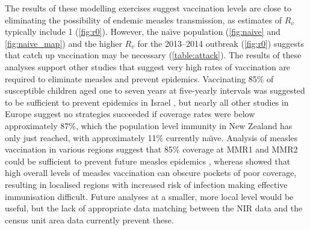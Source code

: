 \documentclass{article}
\begin{document}
The results of these modelling exercises suggest vaccination levels are close to eliminating the possibility of endemic measles transmission, as estimates of $R_v$ typically include 1 (\autoref{fig:r0}). However, the na\"{\i}ve population (\autoref{fig:naive} and \autoref{fig:naive_map}) and the higher $R_v$ for the 2013--2014 outbreak (\autoref{fig:r0}) suggests that catch up vaccination may be necessary (\autoref{table:attack}). The results of these analyses support other studies that suggest very high rates of vaccination are required to eliminate measles and prevent epidemics. Vaccinating 85\% of susceptible children aged one to seven years at five-yearly intervals was suggested to be sufficient to prevent epidemics in Israel \citep{agur93}, but nearly all other studies in Europe suggest no strategies succeeded if coverage rates were below approximately 87\%, which the population level immunity in New Zealand has only just reached, with approximately 11\% currently na\"{\i}ve. Analysis of measles vaccination in various regions suggest that 85\% coverage at MMR1 and MMR2 could be sufficient to prevent future measles epidemics \citep{agur93, babad95, edmunds0, gay98, wallinga1}, whereas \citep{glass4} showed that high overall levels of measles vaccination can obscure pockets of poor coverage, resulting in localised regions with increased risk of infection making effective immunisation difficult. Future analyses at a smaller, more local level would be useful, but the lack of appropriate data matching between the NIR data and the census unit area data currently prevent these.
\end{document}
